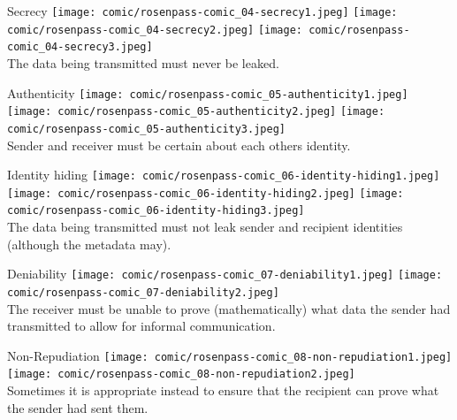 \begin{frame}{Secrecy}
  \centering
  \texttt{[image: comic/rosenpass-comic\_04-secrecy1.jpeg]}
  \texttt{[image: comic/rosenpass-comic\_04-secrecy2.jpeg]}
  \texttt{[image: comic/rosenpass-comic\_04-secrecy3.jpeg]}
  \large
  \\ The data being transmitted must never be leaked.
\end{frame}

\begin{frame}{Authenticity}
  \centering
  \texttt{[image: comic/rosenpass-comic\_05-authenticity1.jpeg]}
  \texttt{[image: comic/rosenpass-comic\_05-authenticity2.jpeg]}
  \texttt{[image: comic/rosenpass-comic\_05-authenticity3.jpeg]}
  \large
  \\ Sender and receiver must be certain about each others identity.
\end{frame}

\begin{frame}{Identity hiding}
  \centering
  \texttt{[image: comic/rosenpass-comic\_06-identity-hiding1.jpeg]}
  \texttt{[image: comic/rosenpass-comic\_06-identity-hiding2.jpeg]}
  \texttt{[image: comic/rosenpass-comic\_06-identity-hiding3.jpeg]}
  \large
  \\ The data being transmitted must not leak sender and recipient identities (although the metadata may).
\end{frame}

\begin{frame}{Deniability}
  \centering
  \texttt{[image: comic/rosenpass-comic\_07-deniability1.jpeg]}
  \texttt{[image: comic/rosenpass-comic\_07-deniability2.jpeg]}
  \large
  \\ The receiver must be unable to prove (mathematically) what data the sender had transmitted to allow for informal communication.
\end{frame}

\begin{frame}{Non-Repudiation}
  \centering
  \texttt{[image: comic/rosenpass-comic\_08-non-repudiation1.jpeg]}
  \texttt{[image: comic/rosenpass-comic\_08-non-repudiation2.jpeg]}
  \large
  \\ Sometimes it is appropriate instead to ensure that the recipient can prove what the sender had sent them.
\end{frame}


